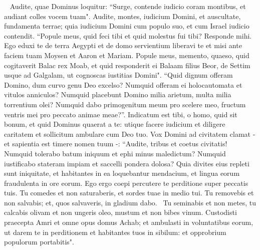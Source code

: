 \begin{biblechapter}   
\verse Audite, quae Dominus loquitur: “Surge, contende iudicio coram montibus, et audiant colles vocem tuam". 
\verse Audite, montes, iudicium Domini, et auscultate, fundamenta terrae; quia iudicium Domini cum populo suo, et cum Israel iudicio contendit. 
\verse “Popule meus, quid feci tibi et quid molestus fui tibi? Responde mihi. 
\verse Ego eduxi te de terra Aegypti et de domo servientium liberavi te et misi ante faciem tuam Moysen et Aaron et Mariam. 
\verse Popule meus, memento, quaeso, quid cogitaverit Balac rex Moab, et quid responderit ei Balaam filius Beor, de Settim usque ad Galgalam, ut cognoscas iustitias Domini". 
\verse “Quid dignum offeram Domino, dum curvo genu Deo excelso? Numquid offeram ei holocautomata et vitulos anniculos? 
\verse Numquid placebunt Domino milia arietum, multa milia torrentium olei? Numquid dabo primogenitum meum pro scelere meo, fructum ventris mei pro peccato animae meae?”. 
\verse Indicatum est tibi, o homo, quid sit bonum, et quid Dominus quaerat a te: utique facere iudicium et diligere caritatem et sollicitum ambulare cum Deo tuo. 
\verse Vox Domini ad civitatem clamat - et sapientia est timere nomen tuum -: “Audite, tribus et coetus civitatis! 
\verse Numquid tolerabo batum iniquum et ephi minus maledictum? 
\verse Numquid iustificabo stateram impiam et saccelli pondera dolosa? 
\verse Quia divites eius repleti sunt iniquitate, et habitantes in ea loquebantur mendacium, et lingua eorum fraudulenta in ore eorum. 
\verse Ego ergo coepi percutere te perditione super peccatis tuis. 
\verse Tu comedes et non saturaberis, et sordes tuae in medio tui. Tu removebis et non salvabis; et, quos salvaveris, in gladium dabo.  
\verse Tu seminabis et non metes, tu calcabis olivam et non ungeris oleo, mustum et non bibes vinum. 
\verse Custodisti praecepta Amri et omne opus domus Achab; et ambulasti in voluntatibus eorum, ut darem te in perditionem et habitantes tuos in sibilum: et opprobrium populorum portabitis". 
\end{biblechapter}


